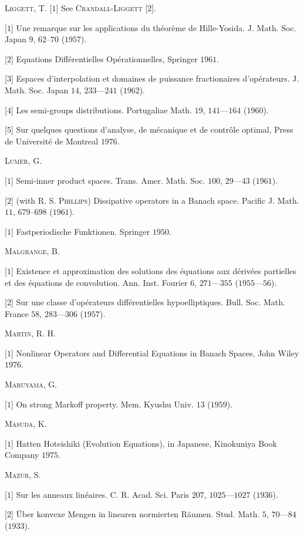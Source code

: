 \textsc{Liggett}, T. [$1$] See \textsc{Crandall}-\textsc{Liggett} [$2$]. 

[$1$] Une remarque sur les applications du théorème de Hille-Yosida. J. Math. Soc. Japan $9$, $62$--$70$ ($1957$). 

[$2$] Equations Différentielles Opérationnelles, Springer $1961$. 

[$3$] Espaces d'interpolation et domaines de puissance fractionaires d'opérateurs. J. Math. Soc. Japan $14$, $233$---$241$ ($1962$). 

[$4$] Les semi-groups distributions. Portugaliae Math. $19$, $141$---$164$ ($1960$). 

[$5$] Sur quelques questions d'analyse, de mécanique et de contrôle optimal, Press de Université de Montreal $1976$. 

\textsc{Lumer}, G. 

[$1$] Semi-inner product spaces. Trans. Amer. Math. Soc. $100$, $29$---$43$ ($1961$). 

[$2$] (with R. S. \textsc{Phillips}) Dissipative operators in a Banach space. Pacific J. Math. $11$, $679$--$698$ ($1961$). 

[$1$] Fastperiodische Funktionen. Springer $1950$. 

\textsc{Malgrange}, B. 

[$1$] Existence et approximation des solutions des équations aux dérivées partielles et des équations de convolution. Ann. Inst. Fourier $6$, $271$---$355$ ($1955$---$56$). 

[$2$] Sur une classe d'opérateurs différentielles hypoelliptiques. Bull. Soc. Math. France $58$, $283$---$306$ ($1957$). 

\textsc{Martin}, R. H. 

[$1$] Nonlinear Operators and Differential Equations in Banach Spaces, John Wiley $1976$. 

\textsc{Maruyama}, G. 

[$1$] On strong Markoff property. Mem. Kyushu Univ. $13$ ($1959$). 

\textsc{Masuda}, K. 

[$1$] Hatten Hoteishiki (Evolution Equations), in Japanese, Kinokuniya Book Company $1975$. 

\textsc{Mazur}, S. 

[$1$] Sur les anneaux linéaires. C. R. Acad. Sci. Paris $207$, $1025$---$1027$ ($1936$). 

[$2$] Über konvexe Mengen in linearen normierten Räumen. Stud. Math. $5$, $70$---$84$ ($1933$). 

